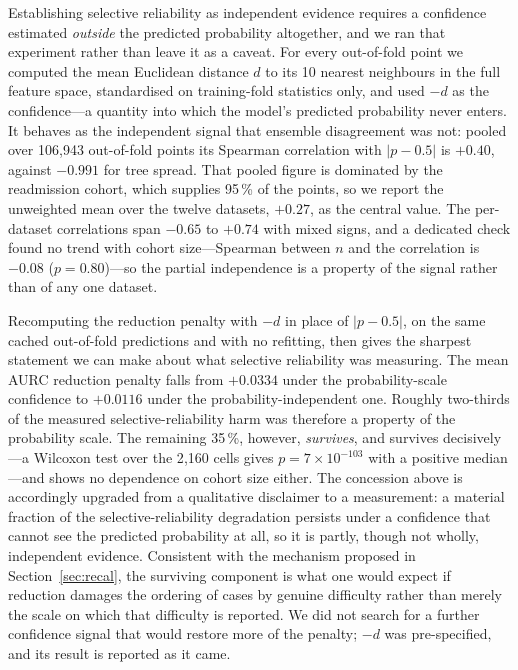 \documentclass[fleqn,10pt]{wlscirep}
\newcommand{\result}[1]{#1}
\begin{document}
Establishing selective reliability as independent evidence requires a confidence estimated
\emph{outside} the predicted probability altogether, and we ran that experiment rather than leave it
as a caveat. For every out-of-fold point we computed the mean Euclidean distance $d$ to its
\result{10} nearest neighbours in the full feature space, standardised on training-fold statistics
only, and used $-d$ as the confidence---a quantity into which the model's predicted probability never
enters. It behaves as the independent signal that ensemble disagreement was not: pooled over
\result{106{,}943} out-of-fold points its Spearman correlation with $|p-0.5|$ is \result{$+0.40$},
against \result{$-0.991$} for tree spread. That pooled figure is dominated by the readmission cohort,
which supplies \result{95\,\%} of the points, so we report the unweighted mean over the twelve
datasets, \result{$+0.27$}, as the central value. The per-dataset correlations span
\result{$-0.65$} to \result{$+0.74$} with mixed signs, and a dedicated check found no trend with
cohort size---Spearman between $n$ and the correlation is \result{$-0.08$}
($p=\result{0.80}$)---so the partial independence is a property of the signal rather than of any one
dataset.

Recomputing the reduction penalty with $-d$ in place of $|p-0.5|$, on the same cached out-of-fold
predictions and with no refitting, then gives the sharpest statement we can make about what selective
reliability was measuring. The mean AURC reduction penalty falls from \result{$+0.0334$} under the
probability-scale confidence to \result{$+0.0116$} under the probability-independent one. Roughly
\result{two-thirds} of the measured selective-reliability harm was therefore a property of the
probability scale. The
remaining \result{35\,\%}, however, \emph{survives}, and survives decisively---a Wilcoxon test over
the \result{2{,}160} cells gives $p=\result{7\times10^{-103}}$ with a positive median---and shows no
dependence on cohort size either. The concession above is accordingly upgraded from a qualitative
disclaimer to a measurement: a material fraction of the selective-reliability degradation persists
under a confidence that cannot see the predicted probability at all, so it is partly, though not
wholly, independent evidence. Consistent with the mechanism proposed in
Section~\ref{sec:recal}, the surviving component is what one would expect if reduction damages the
ordering of cases by genuine difficulty rather than merely the scale on which that difficulty is
reported. We did not search for a further confidence signal that would restore more of the penalty;
$-d$ was pre-specified, and its result is reported as it came.
\end{document}
